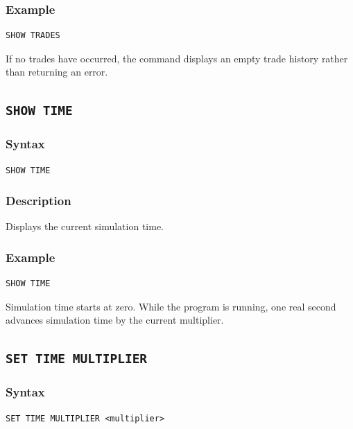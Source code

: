 \documentclass{article}
\begin{document}
\subsubsection*{Example}

\begin{lstlisting}
SHOW TRADES
\end{lstlisting}

If no trades have occurred, the command displays an empty trade
history rather than returning an error.

\subsection{\texttt{SHOW TIME}}

\subsubsection*{Syntax}

\begin{lstlisting}
SHOW TIME
\end{lstlisting}

\subsubsection*{Description}

Displays the current simulation time.

\subsubsection*{Example}

\begin{lstlisting}
SHOW TIME
\end{lstlisting}

Simulation time starts at zero. While the program is running, one real second
advances simulation time by the current multiplier.

\subsection{\texttt{SET TIME MULTIPLIER}}

\subsubsection*{Syntax}

\begin{lstlisting}
SET TIME MULTIPLIER <multiplier>
\end{lstlisting}
\end{document}
